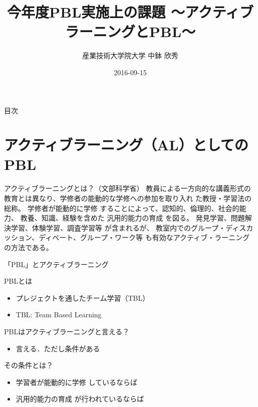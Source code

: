 \documentclass[uplatex,dvipdfmx,14pt,presentation,t]{beamer}
\author{産業技術大学院大学 \linebreak 中鉢 欣秀}
\date{2016-09-15}
\title{今年度PBL実施上の課題 \linebreak\normalsize 〜アクティブラーニングとPBL〜}
\begin{document}
\maketitle
\begin{frame}{目次}
\tableofcontents
\end{frame}


\section{アクティブラーニング（AL）としてのPBL}
\label{sec-1}
\begin{frame}[label=sec-1-1]{\normalsize アクティブラーニングとは？（文部科学省）}
教員による一方向的な講義形式の教育とは異なり、学修者の能動的な学修への参加を取り入れ
た教授・学習法の総称。 \alert{学修者が能動的に学修} することによって、認知的、倫理的、社会的能力、
教養、知識、経験を含めた \alert{汎用的能力の育成} を図る。
 発見学習、問題解決学習、体験学習、調査学習等
 が含まれるが、
 \alert{教室内でのグループ・ディスカッション、ディベート、グループ・ワーク等}
も有効なアクティブ・ラーニングの方法である。
\end{frame}
\begin{frame}[label=sec-1-2]{「PBL」とアクティブラーニング}
\begin{block}{PBLとは}
\begin{itemize}
\item プレジェクトを通したチーム学習（TBL）
\item TBL: Team Based Learning
\end{itemize}
\pause
\end{block}
\begin{block}{PBLはアクティブラーニングと言える？}
\begin{itemize}
\item 言える．ただし条件がある
\end{itemize}
\pause
\end{block}
\begin{block}{その条件とは？}
\begin{itemize}
\item \alert{学習者が能動的に学修} しているならば
\item \alert{汎用的能力の育成} が行われているならば
\end{itemize}
\end{block}
\end{frame}
\end{document}

